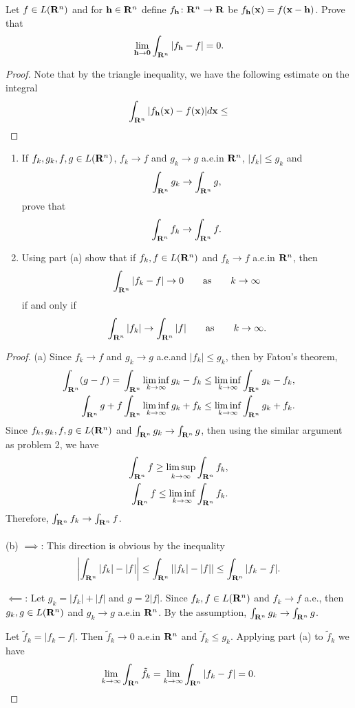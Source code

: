\begin{problem}
Let $f\in L(\mathbf{R}^n)$ and for $\mathbf{h}\in\mathbf{R}^n$ define
$f_{\mathbf{h}}\colon\mathbf{R}^n\to\mathbf{R}$ be $f_{\mathbf{h}}(\mathbf{x})=
f(\mathbf{x}-\mathbf{h})$. Prove that
\[
\lim_{\mathbf{h}\to\mathbf{0}}\int_{\mathbf{R}^n}\left|f_{\mathbf{h}}-f\right|=0.
\]
\end{problem}
\begin{proof}
Note that by the triangle inequality, we have the following estimate on the
integral
\begin{equation}
\label{eq:minokwski-estimate-6}
\int_{\mathbf{R}^n}|f_{\mathbf{h}}(\mathbf{x})-f(\mathbf{x})| d \mathbf{x}\leq
\end{equation}

\end{proof}

\begin{problem}
\begin{enumerate}[label=(\alph*)]
\item If $f_k,g_k,f,g\in L(\mathbf{R}^n)$, $f_k\to f$ and $g_k\to g$ a.e.\@ in
  $\mathbf{R}^n$, $|f_k|\leq g_k$ and
\[
\int_{\mathbf{R}^n}g_k\to\int_{\mathbf{R}^n}g,
\]
prove that
\[
\int_{\mathbf{R}^n} f_k\to\int_{\mathbf{R}^n}f.
\]
\item Using part (a) show that if $f_k,f\in L(\mathbf{R}^n)$ and $f_k\to f$
  a.e.\@ in $\mathbf{R}^n$, then
\[
\int_{\mathbf{R}^n}|f_k-f|\to 0\qquad\text{as}\qquad k\to\infty
\]
if and only if
\[
\int_{\mathbf{R}^n}|f_k|\to\int_{\mathbf{R}^n}|f|\qquad\text{as}\qquad k\to\infty.
\]
\end{enumerate}
\end{problem}
\begin{proof}
(a) Since $f_k\to f$ and $g_k\to g$ a.e.\@ and $|f_k|\leq g_k$, then by
Fatou's theorem,
\begin{align*}
\int_{\mathbf{R}^n}(g-f)
={}&\int_{\mathbf{R}^n}\liminf_{k\to\infty} g_k-f_k
\leq\liminf_{k\to\infty}\int_{\mathbf{R}^n}g_k-f_k,\\
\int_{\mathbf{R}^n}g+f&\int_{\mathbf{R}^n}\liminf_{k\to\infty}g_k+f_k\leq\liminf_{k\to\infty}\int_{\mathbf{R}^n}g_k+f_k.
\end{align*}
Since $f_k,g_k,f,g\in L(\mathbf{R}^n)$ and $\int_{\mathbf{R}^n}g_k\to\int_{\mathbf{R}^n}g$,
then using the similar argument as problem 2, we have
\[
  \begin{aligned}
   \int_{\mathbf{R}^n}f\geq\limsup_{k\to\infty}\int_{\mathbf{R}^n}f_k,\\
   \int_{\mathbf{R}^n}f\leq\liminf_{k\to\infty}\int_{\mathbf{R}^n} f_k.
  \end{aligned}
\]
Therefore, $\int_{\mathbf{R}^n}f_k\to\int_{\mathbf{R}^n} f$.
\\\\
(b) $\implies$: This direction is obvious by the inequality
\[
\left|\int_{\mathbf{R}^n}|f_k|-|f|\right|\leq\int_{\mathbf{R}^n}\left||f_k|-|f|\right|\leq\int_{\mathbf{R}^n}|f_k-f|.
\]

$\impliedby$: Let $g_k= |f_k|+|f|$ and $g= 2|f|$. Since
$f_k,f\in L(\mathbf{R}^n)$ and $f_k\to f$ a.e., then $g_k,g\in L(\mathbf{R}^n)$ and
$g_k\to g$ a.e.\@ in $\mathbf{R}^n$. By the assumption, $\int_{\mathbf{R}^n}
g_k\to\int_{\mathbf{R}^n}g$.

Let $\tilde f_k=|f_k-f|$. Then $\tilde f_k\to 0$ a.e.\@ in $\mathbf{R}^n$
and $\tilde f_k\leq g_k$. Applying part (a) to $\tilde f_k$ we have
\[
\lim_{k\to\infty}\int_{\mathbf{R}^n}\tilde f_k=\lim_{k\to\infty}\int_{\mathbf{R}^n}|f_k-f|=0.
\]
\end{proof}
